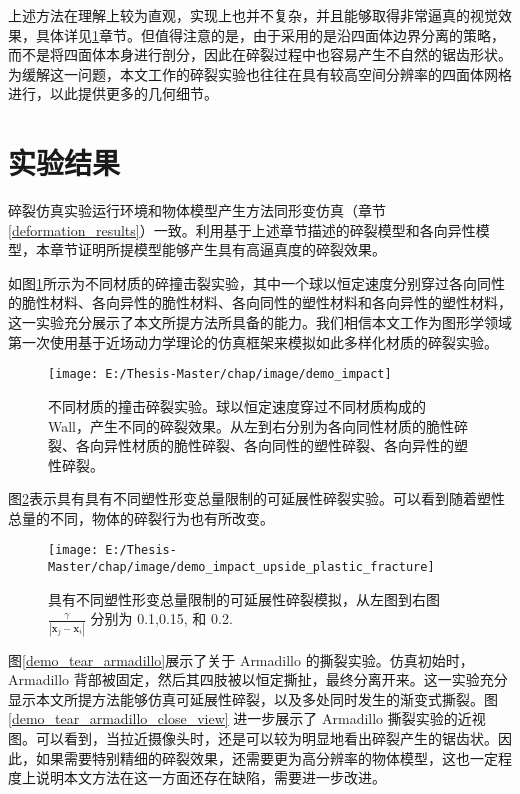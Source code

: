 上述方法在理解上较为直观，实现上也并不复杂，并且能够取得非常逼真的视觉效果，具体详见\ref{fracture_results}章节。但值得注意的是，由于采用的是沿四面体边界分离的策略，而不是将四面体本身进行剖分，因此在碎裂过程中也容易产生不自然的锯齿形状。为缓解这一问题，本文工作的碎裂实验也往往在具有较高空间分辨率的四面体网格进行，以此提供更多的几何细节。


\section{实验结果}
\label{fracture_results}
碎裂仿真实验运行环境和物体模型产生方法同形变仿真（章节\ref{deformation_results}）一致。利用基于上述章节描述的碎裂模型和各向异性模型，本章节证明所提模型能够产生具有高逼真度的碎裂效果。

如图\ref{demo_impact}所示为不同材质的碎撞击裂实验，其中一个球以恒定速度分别穿过各向同性的脆性材料、各向异性的脆性材料、各向同性的塑性材料和各向异性的塑性材料，这一实验充分展示了本文所提方法所具备的能力。我们相信本文工作为图形学领域第一次使用基于近场动力学理论的仿真框架来模拟如此多样化材质的碎裂实验。

\begin{figure}[!htb]
  \centering
  \captionsetup{justification=centering}
  \texttt{[image: E:/Thesis-Master/chap/image/demo\_impact]}

  \caption{\label{demo_impact}
           不同材质的撞击碎裂实验。球以恒定速度穿过不同材质构成的 Wall，产生不同的碎裂效果。从左到右分别为各向同性材质的脆性碎裂、各向异性材质的脆性碎裂、各向同性的塑性碎裂、各向异性的塑性碎裂。
          }
\end{figure}

图\ref{demo_impact_upside_plastic_fracture}表示具有具有不同塑性形变总量限制的可延展性碎裂实验。可以看到随着塑性总量的不同，物体的碎裂行为也有所改变。

\begin{figure}[!htb]
  \centering
  \captionsetup{justification=centering}
  \texttt{[image: E:/Thesis-Master/chap/image/demo\_impact\_upside\_plastic\_fracture]}

  \caption{\label{demo_impact_upside_plastic_fracture}
           具有不同塑性形变总量限制的可延展性碎裂模拟，从左图到右图 $\frac{\gamma}{|\mathbf{x}_j-\mathbf{x}_i|}$ 分别为 0.1,0.15, 和 0.2.
          }
\end{figure}

图\ref{demo_tear_armadillo}展示了关于 Armadillo 的撕裂实验。仿真初始时，Armadillo 背部被固定，然后其四肢被以恒定撕扯，最终分离开来。这一实验充分显示本文所提方法能够仿真可延展性碎裂，以及多处同时发生的渐变式撕裂。图\ref{demo_tear_armadillo_close_view} 进一步展示了 Armadillo 撕裂实验的近视图。可以看到，当拉近摄像头时，还是可以较为明显地看出碎裂产生的锯齿状。因此，如果需要特别精细的碎裂效果，还需要更为高分辨率的物体模型，这也一定程度上说明本文方法在这一方面还存在缺陷，需要进一步改进。

